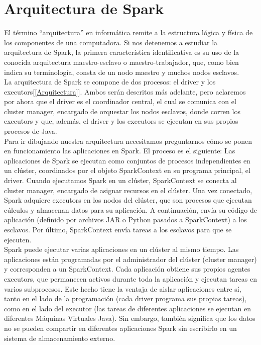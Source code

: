 \chapter{Arquitectura de Spark}

El término “arquitectura” en informática remite a la estructura lógica y física de los componentes de una computadora. Si nos detenemos a estudiar la arquitectura de Spark, la primera característica identificativa es su uso de la conocida arquitectura maestro-esclavo o maestro-trabajador, que, como bien indica su terminología, consta de un nodo maestro y muchos nodos esclavos.\\
 
La arquitectura de Spark se compone de dos procesos: el driver y los executors[\ref{Arquitectura}]. Ambos serán descritos más adelante, pero aclaremos por ahora que el driver es el coordinador central, el cual se comunica con el cluster manager, encargado de orquestar los nodos esclavos, donde corren los executors y que, además, el driver y los executors se ejecutan en sus propios procesos de Java.\\
 
Para ir dibujando nuestra arquitectura necesitamos preguntarnos cómo se ponen en funcionamiento las aplicaciones en Spark. El proceso es el siguiente: Las aplicaciones de Spark se ejecutan como conjuntos de procesos independientes en un clúster, coordinados por el objeto SparkContext en su programa principal, el driver. Cuando ejecutamos Spark en un clúster, SparkContext se conecta al cluster manager, encargado de asignar recursos en el clúster. Una vez conectado, Spark adquiere executors en los nodos del clúster, que son procesos que ejecutan cúlculos y almacenan datos para su aplicación. A continuación, envía su código de aplicación (definido por archivos JAR o Python pasados a SparkContext) a los esclavos. Por último, SparkContext envía tareas a los esclavos para que se ejecuten.\\
 
Spark puede ejecutar varias aplicaciones en un clúster al mismo tiempo. Las aplicaciones están programadas por el administrador del clúster (cluster manager) y corresponden a un SparkContext. Cada aplicación obtiene sus propios agentes executors, que permanecen activos durante toda la aplicación y ejecutan tareas en varios subprocesos. Este hecho tiene la ventaja de aislar aplicaciones entre sí, tanto en el lado de la programación (cada driver programa sus propias tareas), como en el lado del executor (las tareas de diferentes aplicaciones se ejecutan en diferentes Máquinas Virtuales Java). Sin embargo, también significa que los datos no se pueden compartir en diferentes aplicaciones Spark sin escribirlo en un sistema de almacenamiento externo.\\
 
